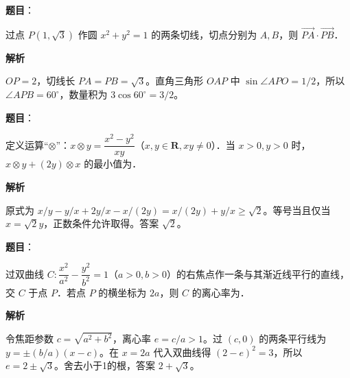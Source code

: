 \begin{answer}

\textbf{题目}：

过点 \(P(1,\sqrt3)\) 作圆 \(x^2+y^2=1\) 的两条切线，切点分别为 \(A,B\)，则 \(\overrightarrow{PA}\cdot\overrightarrow{PB}\)\gkblank{}．

\textbf{解析}

\(OP=2\)，切线长 \(PA=PB=\sqrt3\)。直角三角形 \(OAP\) 中 \(\sin\angle APO=1/2\)，所以 \(\angle APB=60^\circ\)，数量积为 \(3\cos60^\circ=3/2\)。


\end{answer}
\begin{answer}

\textbf{题目}：

定义运算“\(\otimes\)”：\(x\otimes y=\dfrac{x^2-y^2}{xy}\)（\(x,y\in\mathbf{R},xy\ne0\)）．当 \(x>0,y>0\) 时，\(x\otimes y+(2y)\otimes x\) 的最小值为\gkblank{}．

\textbf{解析}

原式为 \(x/y-y/x+2y/x-x/(2y)=x/(2y)+y/x\geqslant\sqrt2\)。等号当且仅当 \(x=\sqrt2y\)，正数条件允许取得。答案 \(\sqrt2\)。


\end{answer}
\begin{answer}

\textbf{题目}：

过双曲线 \(C:\dfrac{x^2}{a^2}-\dfrac{y^2}{b^2}=1\)（\(a>0,b>0\)）的右焦点作一条与其渐近线平行的直线，交 \(C\) 于点 \(P\)．若点 \(P\) 的横坐标为 \(2a\)，则 \(C\) 的离心率为\gkblank{}．

\textbf{解析}

令焦距参数 \(c=\sqrt{a^2+b^2}\)，离心率 \(e=c/a>1\)。过 \((c,0)\) 的两条平行线为 \(y=\pm(b/a)(x-c)\)。在 \(x=2a\) 代入双曲线得 \((2-e)^2=3\)，所以 \(e=2\pm\sqrt3\)。舍去小于1的根，答案 \(2+\sqrt3\)。


\end{answer}
